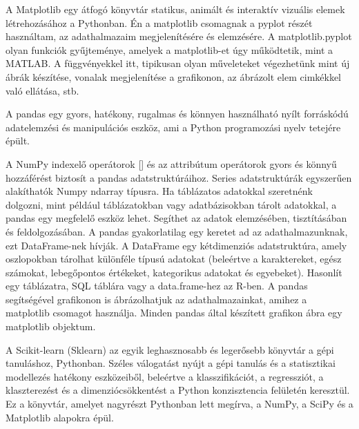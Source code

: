 A Matplotlib egy átfogó könyvtár statikus, animált és interaktív vizuális elemek létrehozásához a Pythonban.
Én a matplotlib csomagnak a pyplot részét használtam, az adathalmazaim megjelenítésére és elemzésére. A matplotlib.pyplot olyan funkciók gyűjteménye, amelyek a matplotlib-et úgy működtetik, mint a MATLAB. A függvényekkel itt, tipikusan olyan műveleteket végezhetünk mint új ábrák készítése, vonalak megjelenítése a grafikonon, az ábrázolt elem cimkékkel való ellátása, stb.

A pandas egy gyors, hatékony, rugalmas és könnyen használható nyílt forráskódú adatelemzési és manipulációs eszköz, ami a Python programozási nyelv tetejére épült.

A NumPy indexelő operátorok [] és az attribútum operátorok gyors és könnyű hozzáférést biztosít a pandas adatstruktúráihoz. Series adatstruktúrák egyszerűen alakíthatók Numpy ndarray típusra.
Ha táblázatos adatokkal szeretnénk dolgozni, mint például táblázatokban vagy adatbázisokban tárolt adatokkal, a pandas egy megfelelő eszköz lehet. Segíthet az adatok elemzésében, tisztításában és feldolgozásában. A pandas gyakorlatilag egy keretet ad az adathalmazunknak, ezt DataFrame-nek hívják. A DataFrame egy kétdimenziós adatstruktúra, amely oszlopokban tárolhat különféle típusú adatokat (beleértve a karaktereket, egész számokat, lebegőpontos értékeket, kategorikus adatokat és egyebeket). Hasonlít egy táblázatra, SQL táblára vagy a data.frame-hez az R-ben.
A pandas segítségével grafikonon is ábrázolhatjuk az adathalmazainkat, amihez a matplotlib csomagot használja. Minden pandas által készített grafikon ábra egy matplotlib objektum.


A Scikit-learn (Sklearn) az egyik leghasznosabb és legerősebb könyvtár a gépi tanuláshoz, Pythonban. Széles válogatást nyújt a gépi tanulás és a statisztikai modellezés hatékony eszközeiből, beleértve a klasszifikációt, a regressziót, a klaszterezést és a dimenziócsökkentést a Python konzisztencia felületén keresztül. Ez a könyvtár, amelyet nagyrészt Pythonban lett megírva, a NumPy, a SciPy és a Matplotlib alapokra épül.
